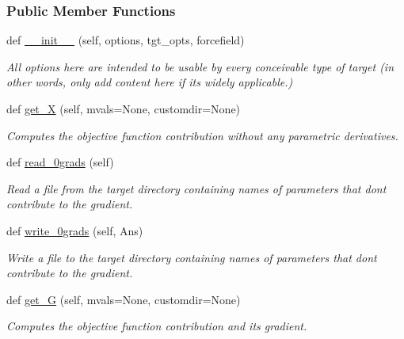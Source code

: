 \subsubsection*{Public Member Functions}
\begin{DoxyCompactItemize}
\item 
def \hyperlink{classsrc_1_1target_1_1Target_ad813da97ae8fc89665a12c35145cdde6}{\+\_\+\+\_\+init\+\_\+\+\_\+} (self, options, tgt\+\_\+opts, forcefield)
\begin{DoxyCompactList}\small\item\em All options here are intended to be usable by every conceivable type of target (in other words, only add content here if it\textquotesingle{}s widely applicable.) \end{DoxyCompactList}\item 
def \hyperlink{classsrc_1_1target_1_1Target_acd106ed266687c08937944d4c0d17d87}{get\+\_\+X} (self, mvals=None, customdir=None)
\begin{DoxyCompactList}\small\item\em Computes the objective function contribution without any parametric derivatives. \end{DoxyCompactList}\item 
def \hyperlink{classsrc_1_1target_1_1Target_a606efa8b4e93982266468373c809e36a}{read\+\_\+0grads} (self)
\begin{DoxyCompactList}\small\item\em Read a file from the target directory containing names of parameters that don\textquotesingle{}t contribute to the gradient. \end{DoxyCompactList}\item 
def \hyperlink{classsrc_1_1target_1_1Target_af4d54bc36363a73ab3cec203a30d72be}{write\+\_\+0grads} (self, Ans)
\begin{DoxyCompactList}\small\item\em Write a file to the target directory containing names of parameters that don\textquotesingle{}t contribute to the gradient. \end{DoxyCompactList}\item 
def \hyperlink{classsrc_1_1target_1_1Target_abd888e5a08e9858fcf72dbad7133d538}{get\+\_\+G} (self, mvals=None, customdir=None)
\begin{DoxyCompactList}\small\item\em Computes the objective function contribution and its gradient. \end{DoxyCompactList}\item 

\end{DoxyCompactItemize}
